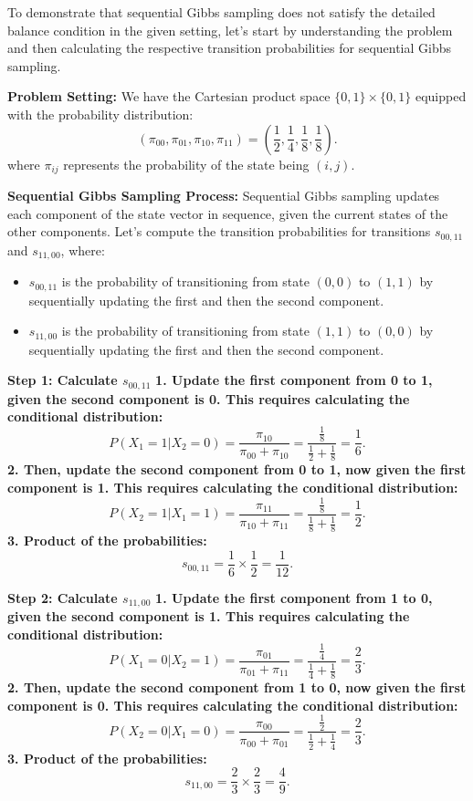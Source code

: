 \documentclass[8pt]{article}
\begin{document}
To demonstrate that sequential Gibbs sampling does not satisfy the detailed balance condition in the given setting, let's start by understanding the problem and then calculating the respective transition probabilities for sequential Gibbs sampling.

\textbf{Problem Setting:}
We have the Cartesian product space \(\{0, 1\} \times \{0, 1\}\) equipped with the probability distribution:
\[
(\pi_{00}, \pi_{01}, \pi_{10}, \pi_{11}) = \left( \frac{1}{2}, \frac{1}{4}, \frac{1}{8}, \frac{1}{8} \right).
\]
where \(\pi_{ij}\) represents the probability of the state being \((i, j)\).

\textbf{Sequential Gibbs Sampling Process:}
Sequential Gibbs sampling updates each component of the state vector in sequence, given the current states of the other components. Let's compute the transition probabilities for transitions \(s_{00, 11}\) and \(s_{11, 00}\), where:
\begin{itemize}
    \item \(s_{00, 11}\) is the probability of transitioning from state \((0, 0)\) to \((1, 1)\) by sequentially updating the first and then the second component.
    \item \(s_{11, 00}\) is the probability of transitioning from state \((1, 1)\) to \((0, 0)\) by sequentially updating the first and then the second component.
\end{itemize}

\textbf{Step 1: Calculate \(s_{00, 11}\)}
\textbf{1. Update the first component from 0 to 1, given the second component is 0. This requires calculating the conditional distribution:}
   \[
   P(X_1 = 1 | X_2 = 0) = \frac{\pi_{10}}{\pi_{00} + \pi_{10}} = \frac{\frac{1}{8}}{\frac{1}{2} + \frac{1}{8}} = \frac{1}{6}.
   \]
\textbf{2. Then, update the second component from 0 to 1, now given the first component is 1. This requires calculating the conditional distribution:}
   \[
   P(X_2 = 1 | X_1 = 1) = \frac{\pi_{11}}{\pi_{10} + \pi_{11}} = \frac{\frac{1}{8}}{\frac{1}{8} + \frac{1}{8}} = \frac{1}{2}.
   \]
\textbf{3. Product of the probabilities:}
   \[
   s_{00, 11} = \frac{1}{6} \times \frac{1}{2} = \frac{1}{12}.
   \]

\textbf{Step 2: Calculate \(s_{11, 00}\)}
\textbf{1. Update the first component from 1 to 0, given the second component is 1. This requires calculating the conditional distribution:}
   \[
   P(X_1 = 0 | X_2 = 1) = \frac{\pi_{01}}{\pi_{01} + \pi_{11}} = \frac{\frac{1}{4}}{\frac{1}{4} + \frac{1}{8}} = \frac{2}{3}.
   \]
\textbf{2. Then, update the second component from 1 to 0, now given the first component is 0. This requires calculating the conditional distribution:}
   \[
   P(X_2 = 0 | X_1 = 0) = \frac{\pi_{00}}{\pi_{00} + \pi_{01}} = \frac{\frac{1}{2}}{\frac{1}{2} + \frac{1}{4}} = \frac{2}{3}.
   \]
\textbf{3. Product of the probabilities:}
   \[
   s_{11, 00} = \frac{2}{3} \times \frac{2}{3} = \frac{4}{9}.
   \]
\end{document}
